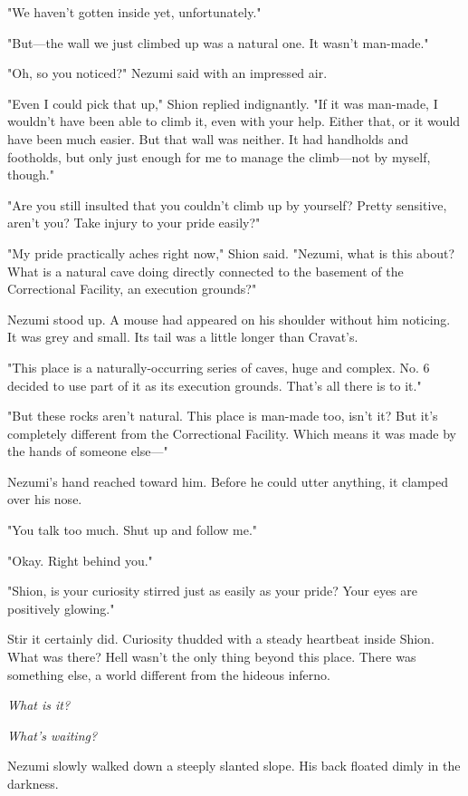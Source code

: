"We haven't gotten inside yet, unfortunately."

"But---the wall we just climbed up was a natural one. It wasn't man-made."

"Oh, so you noticed?" Nezumi said with an impressed air.

"Even I could pick that up," Shion replied indignantly. "If it was
man-made, I wouldn't have been able to climb it, even with your help.
Either that, or it would have been much easier. But that wall was
neither. It had handholds and footholds, but only just enough for me to
manage the climb---not by myself, though."

"Are you still insulted that you couldn't climb up by yourself? Pretty
sensitive, aren't you? Take injury to your pride easily?"

"My pride practically aches right now," Shion said. "Nezumi, what is
this about? What is a natural cave doing directly connected to the
basement of the Correctional Facility, an execution grounds?"

Nezumi stood up. A mouse had appeared on his shoulder without him
noticing. It was grey and small. Its tail was a little longer than
Cravat's.

"This place is a naturally-occurring series of caves, huge and complex.
No. 6 decided to use part of it as its execution grounds. That's all
there is to it."

"But these rocks aren't natural. This place is man-made too, isn't it?
But it's completely different from the Correctional Facility. Which
means it was made by the hands of someone else---"

Nezumi's hand reached toward him. Before he could utter anything, it
clamped over his nose.

"You talk too much. Shut up and follow me."

"Okay. Right behind you."

"Shion, is your curiosity stirred just as easily as your pride? Your
eyes are positively glowing."

Stir it certainly did. Curiosity thudded with a steady heartbeat inside
Shion. What was there? Hell wasn't the only thing beyond this place.
There was something else, a world different from the hideous inferno.

\emph{What is it?}

\emph{What's waiting?}

Nezumi slowly walked down a steeply slanted slope. His back floated
dimly in the darkness.

